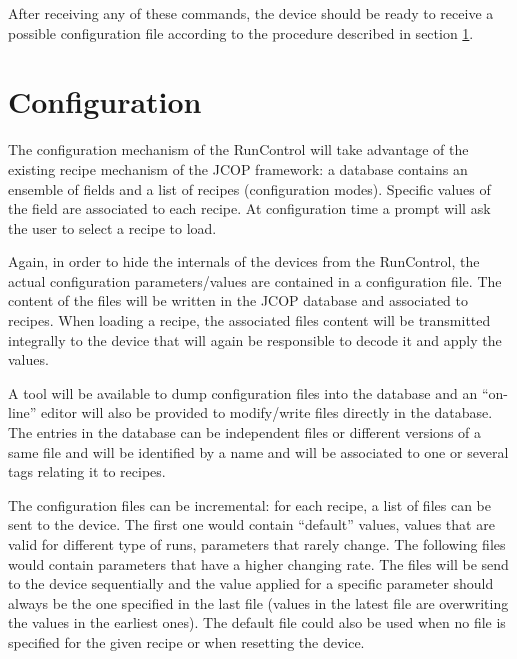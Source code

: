 \documentclass[a4paper]{article}
\begin{document}
After receiving any of these commands, the device should be ready to receive a possible
configuration file according to the procedure described in section \ref{sec:configuration}.

\section{Configuration}\label{sec:configuration}
The configuration mechanism of the RunControl will take advantage of the existing recipe mechanism
of the JCOP\cite{biblio:JCOP} framework: a database contains an ensemble of fields and a list of
recipes (configuration modes). Specific values of the field are associated to each recipe. At
configuration time a prompt will ask the user to select a recipe to load.

Again, in order to hide the internals of the devices from the RunControl, the actual configuration
parameters/values are contained in a configuration file. The content of the files will be written in
the JCOP database and associated to recipes. When loading a recipe, the associated files content
will be transmitted integrally to the device that will again be responsible to decode it and apply
the values.

A tool will be available to dump configuration files into the database and an ``on-line'' editor will
also be provided to modify/write files directly in the database. The entries in the database can be
independent files or different versions of a same file and will be identified by a name and will
be associated to one or several tags relating it to recipes.

The configuration files can be incremental: for each recipe, a list of files can be sent to the
device. The first one would contain ``default'' values, values that are valid for different type of
runs, parameters that rarely change. The following files would contain parameters that have a
higher changing rate. The files will be send to the device sequentially and the value applied for a
specific parameter should always be the one specified in the last file (values in the latest file
are overwriting the values in the earliest ones). The default file could also be used when no file
is specified for the given recipe or when resetting the device.
\end{document}
